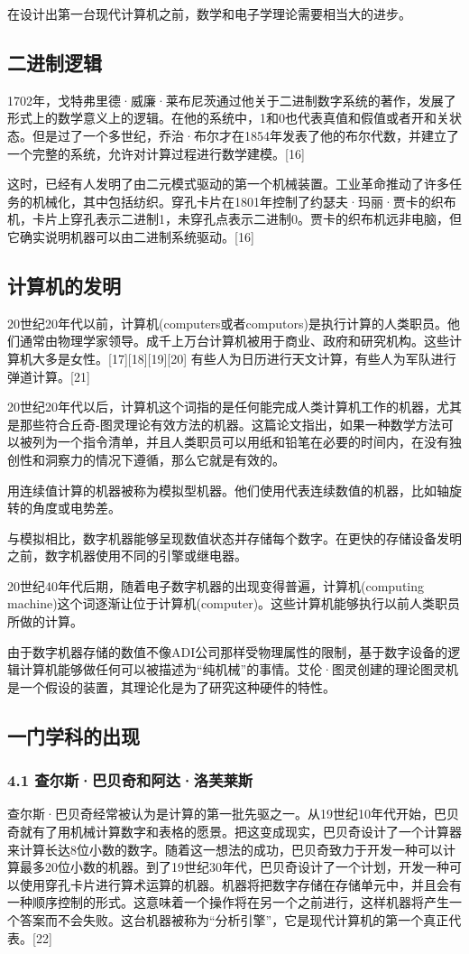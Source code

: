 在设计出第一台现代计算机之前，数学和电子学理论需要相当大的进步。

\subsection{二进制逻辑}
1702年，戈特弗里德·威廉·莱布尼茨通过他关于二进制数字系统的著作，发展了形式上的数学意义上的逻辑。在他的系统中，1和0也代表真值和假值或者开和关状态。但是过了一个多世纪，乔治·布尔才在1854年发表了他的布尔代数，并建立了一个完整的系统，允许对计算过程进行数学建模。[16]

这时，已经有人发明了由二元模式驱动的第一个机械装置。工业革命推动了许多任务的机械化，其中包括纺织。穿孔卡片在1801年控制了约瑟夫·玛丽·贾卡的织布机，卡片上穿孔表示二进制1，未穿孔点表示二进制0。贾卡的织布机远非电脑，但它确实说明机器可以由二进制系统驱动。[16]

\subsection{计算机的发明}
20世纪20年代以前，计算机(computers或者computors)是执行计算的人类职员。他们通常由物理学家领导。成千上万台计算机被用于商业、政府和研究机构。这些计算机大多是女性。[17][18][19][20] 有些人为日历进行天文计算，有些人为军队进行弹道计算。[21]

20世纪20年代以后，计算机这个词指的是任何能完成人类计算机工作的机器，尤其是那些符合丘奇-图灵理论有效方法的机器。这篇论文指出，如果一种数学方法可以被列为一个指令清单，并且人类职员可以用纸和铅笔在必要的时间内，在没有独创性和洞察力的情况下遵循，那么它就是有效的。

用连续值计算的机器被称为模拟型机器。他们使用代表连续数值的机器，比如轴旋转的角度或电势差。

与模拟相比，数字机器能够呈现数值状态并存储每个数字。在更快的存储设备发明之前，数字机器使用不同的引擎或继电器。

20世纪40年代后期，随着电子数字机器的出现变得普遍，计算机(computing machine)这个词逐渐让位于计算机(computer)。这些计算机能够执行以前人类职员所做的计算。

由于数字机器存储的数值不像ADI公司那样受物理属性的限制，基于数字设备的逻辑计算机能够做任何可以被描述为“纯机械”的事情。艾伦·图灵创建的理论图灵机是一个假设的装置，其理论化是为了研究这种硬件的特性。

\subsection{一门学科的出现}
\subsubsection{4.1 查尔斯·巴贝奇和阿达·洛芙莱斯}
查尔斯·巴贝奇经常被认为是计算的第一批先驱之一。从19世纪10年代开始，巴贝奇就有了用机械计算数字和表格的愿景。把这变成现实，巴贝奇设计了一个计算器来计算长达8位小数的数字。随着这一想法的成功，巴贝奇致力于开发一种可以计算最多20位小数的机器。到了19世纪30年代，巴贝奇设计了一个计划，开发一种可以使用穿孔卡片进行算术运算的机器。机器将把数字存储在存储单元中，并且会有一种顺序控制的形式。这意味着一个操作将在另一个之前进行，这样机器将产生一个答案而不会失败。这台机器被称为“分析引擎”，它是现代计算机的第一个真正代表。[22]

